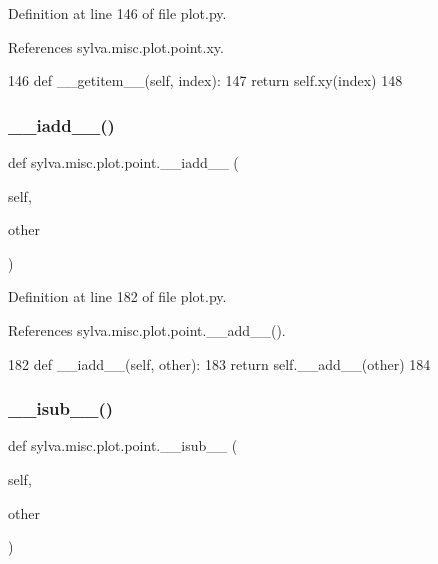 Definition at line 146 of file plot.\+py.



References sylva.\+misc.\+plot.\+point.\+xy.


\begin{DoxyCode}
146         \textcolor{keyword}{def }\_\_getitem\_\_(self, index):
147             \textcolor{keywordflow}{return} self.xy(index)
148 
\end{DoxyCode}
\mbox{\label{classsylva_1_1misc_1_1plot_1_1point_a52992e538e21670f48a5ee5d63aafc5c}} 
\subsubsection{\texorpdfstring{\+\_\+\+\_\+iadd\+\_\+\+\_\+()}{\_\_iadd\_\_()}}
{\footnotesize\ttfamily def sylva.\+misc.\+plot.\+point.\+\_\+\+\_\+iadd\+\_\+\+\_\+ (\begin{DoxyParamCaption}\item[{}]{self,  }\item[{}]{other }\end{DoxyParamCaption})}



Definition at line 182 of file plot.\+py.



References sylva.\+misc.\+plot.\+point.\+\_\+\+\_\+add\+\_\+\+\_\+().


\begin{DoxyCode}
182         \textcolor{keyword}{def }\_\_iadd\_\_(self, other):
183             \textcolor{keywordflow}{return} self.\_\_add\_\_(other)
184 
\end{DoxyCode}
\mbox{\label{classsylva_1_1misc_1_1plot_1_1point_a0f73456638159eb552d6aef70d76ea57}} 
\subsubsection{\texorpdfstring{\+\_\+\+\_\+isub\+\_\+\+\_\+()}{\_\_isub\_\_()}}
{\footnotesize\ttfamily def sylva.\+misc.\+plot.\+point.\+\_\+\+\_\+isub\+\_\+\+\_\+ (\begin{DoxyParamCaption}\item[{}]{self,  }\item[{}]{other }\end{DoxyParamCaption})}



